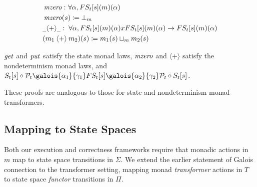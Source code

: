 \small\begin{align*}
&\hspace{0em}  \operatorname{\mathit{mzero}}   \mathbin{\colon}   \forall   \alpha , FS _t  \lbrack s \rbrack (m)( \alpha ) \\
&\hspace{0em}  \operatorname{\mathit{mzero}}( s)  \coloneqq   \bot  _m  \\
&\hspace{0em}  \underline{\hspace{0.5em}}{  \mathbin{\langle + \rangle}  }\underline{\hspace{0.5em}}   \mathbin{\colon}   \forall   \alpha , FS _t  \lbrack s \rbrack (m)( \alpha ) x FS _t  \lbrack s \rbrack (m)( \alpha )  \rightarrow  FS _t  \lbrack s \rbrack (m)( \alpha ) \\
&\hspace{0em} (m _1   \mathbin{\langle + \rangle}  m _2 )(s)  \coloneqq  m _1 (s)  \sqcup  _m  m _2 (s)
\end{align*}\normalsize

\begin{proposition} $ \operatorname{\mathit{get}} $ and $ \operatorname{\mathit{put}} $ satisfy the state
monad laws, $ \operatorname{\mathit{mzero}} $ and $ \mathbin{\langle + \rangle} $ satisfy
the nondeterminism monad laws, and
$S _t  \lbrack s \rbrack   \circ   \mathcal{P}  _t   \galois{\alpha_1}{\gamma_1}  FS _t  \lbrack s \rbrack   \galois{\alpha_2}{\gamma_2}   \mathcal{P}  _t   \circ  S _t  \lbrack s \rbrack $.
\end{proposition} These proofs are analogous to those for state and
nondeterminism monad transformers.

\par

\subsection{Mapping to State Spaces}\label{mapping-to-state-spaces}

\par

Both our execution and correctness frameworks require that monadic
actions in $m$ map to state space transitions in $ \Sigma $. We extend
the earlier statement of Galois connection to the transformer setting,
mapping monad \emph{transformer} actions in $T$ to state space
\emph{functor} transitions in $ \Pi $.

